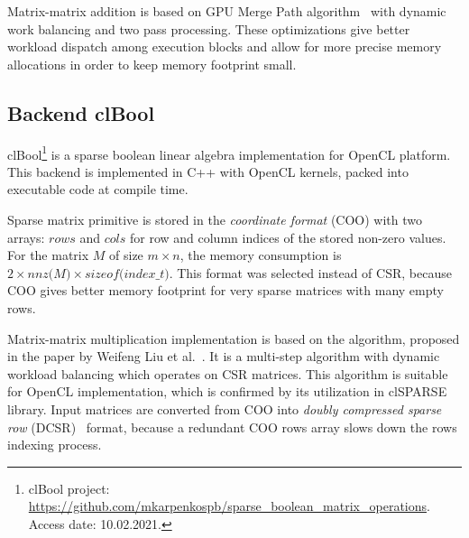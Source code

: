 Matrix-matrix addition is based on GPU Merge Path algorithm~\cite{inproceedings:gpu_merge_path} with dynamic work balancing and two pass processing.
These optimizations give better workload dispatch among execution blocks and allow for more precise memory allocations in order to keep memory footprint small.


\subsection{Backend clBool}

clBool\footnote{clBool project: \url{https://github.com/mkarpenkospb/sparse_boolean_matrix_operations}. Access date: 10.02.2021.} 
is a sparse boolean linear algebra implementation for OpenCL platform.
This backend is implemented in C++ with OpenCL kernels, packed into executable code at compile time. 

Sparse matrix primitive is stored in the \textit{coordinate format} (COO) with two arrays: $rows$ and $cols$ for row and column indices of the stored non-zero values.
For the matrix $M$ of size $m \times n$, the memory consumption is $2 \times \textit{nnz(M)} \times \textit{sizeof(index\_t)}$.
This format was selected instead of CSR, because COO gives better memory footprint for very sparse matrices with many empty rows.

Matrix-matrix multiplication implementation is based on the algorithm, proposed in the paper by Weifeng Liu et al.~\cite{DBLP:journals/corr/0002V15a:spframework}.
It is a multi-step algorithm with dynamic workload balancing which operates on CSR matrices.
This algorithm is suitable for OpenCL implementation, which is confirmed by its utilization in clSPARSE library.
Input matrices are converted from COO into \textit{doubly compressed sparse row} (DCSR)~\cite{4536313:about:dcsr} format,
because a redundant COO rows array slows down the rows indexing process. 

